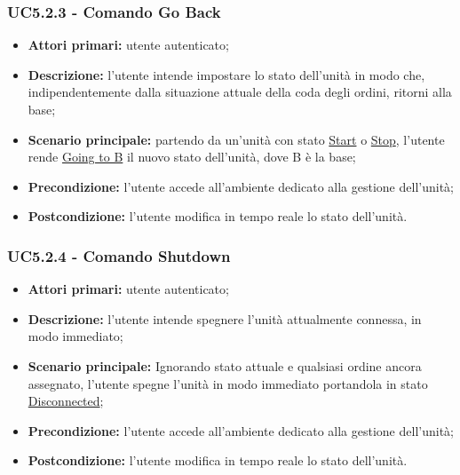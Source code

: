         \subsubsection{UC5.2.3 - Comando Go Back}
        \begin{itemize}
            \item \textbf{Attori primari:} utente autenticato;
            \item \textbf{Descrizione:} l'utente intende impostare lo stato dell'unità in modo che, indipendentemente dalla situazione attuale della coda degli ordini, ritorni alla base;
            \item \textbf{Scenario principale:} partendo da un'unità con stato \underline{Start} o \underline{Stop}, l'utente rende \underline{Going to B} il nuovo stato dell'unità, dove B è la base;
            \item \textbf{Precondizione:} l'utente accede all'ambiente dedicato alla gestione dell'unità;
            \item \textbf{Postcondizione:} l'utente modifica in tempo reale lo stato dell'unità.
        \end{itemize}

        \subsubsection{UC5.2.4 - Comando Shutdown}
        \begin{itemize}
            \item \textbf{Attori primari:} utente autenticato;
            \item \textbf{Descrizione:} l'utente intende spegnere l'unità attualmente connessa, in modo immediato;
            \item \textbf{Scenario principale:} Ignorando stato attuale e qualsiasi ordine ancora assegnato, l'utente spegne l'unità in modo immediato portandola in stato \underline{Disconnected};
            \item \textbf{Precondizione:} l'utente accede all'ambiente dedicato alla gestione dell'unità;
            \item \textbf{Postcondizione:} l'utente modifica in tempo reale lo stato dell'unità.
        \end{itemize}

